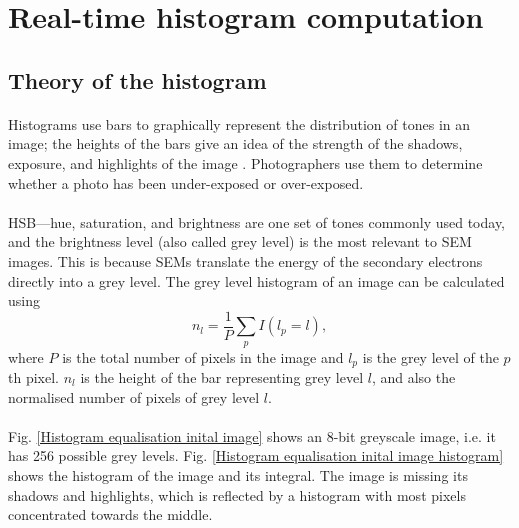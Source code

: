 \documentclass[12pt, twocolumn]{report}
\begin{document}

\section{Real-time histogram computation}
\subsection{Theory of the histogram}
\paragraph{}
Histograms use bars to graphically represent the distribution of tones in an image; the heights of the bars give an idea of the strength of the shadows, exposure, and highlights of the image \cite{Histogram}. Photographers use them to determine whether a photo has been under-exposed or over-exposed.

\paragraph{}
HSB---hue, saturation, and brightness are one set of tones commonly used today, and the brightness level (also called grey level) is the most relevant to SEM images. This is because SEMs translate the energy of the secondary electrons directly into a grey level. The grey level histogram of an image can be calculated using
\begin{equation}
    n_l = \frac{1}{P} \sum_{p} I(l_p=l),
\end{equation}
where $P$ is the total number of pixels in the image and $l_p$ is the grey level of the $p$th pixel. $n_l$ is the height of the bar representing grey level $l$, and also the normalised number of pixels of grey level $l$.

\paragraph{}
Fig. \ref{Histogram equalisation inital image} shows an 8-bit greyscale image, i.e. it has 256 possible grey levels. Fig. \ref{Histogram equalisation inital image histogram} shows the histogram of the image and its integral. The image is missing its shadows and highlights, which is reflected by a histogram with most pixels concentrated towards the middle.
\end{document}
